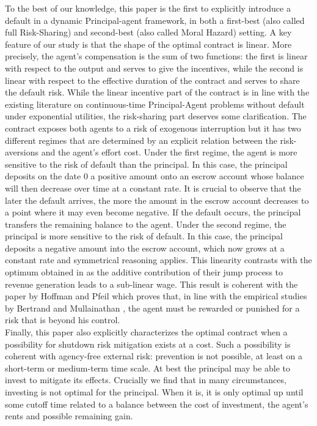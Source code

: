 \documentclass[numbook, envcountsect, envcountsame, envcountreset, runningheads, smallextended]{article}
\begin{document}
\indent To the best of our knowledge, this paper is the first to explicitly introduce a default in a dynamic Principal-agent framework, in both a first-best (also called full Risk-Sharing) and second-best (also called Moral Hazard) setting. 
A key feature of our study is that the shape of the optimal contract is linear.
More precisely, the agent's compensation is the sum of two functions: the first is linear with respect to the output and serves to give the incentives, while the second is linear with respect to the effective duration of the contract and serves to share the default risk. While the linear incentive part of the contract is in line with the existing literature on continuous-time Principal-Agent problems without default under exponential utilities, the risk-sharing part deserves some clarification. 
The contract exposes both agents to a risk of exogenous interruption but it has two different regimes that are determined by an explicit relation between the risk-aversions and the agent's effort cost. Under the first regime, the agent is more sensitive to the risk of default than the principal. In this case, the principal deposits on the date $0$ a positive amount onto an escrow account whose balance will then decrease over time at a constant rate.  It is crucial to observe that the later the default arrives, the more the amount in the escrow account decreases to a point where it may even become negative. If the default occurs, the principal transfers the remaining balance to the agent. Under the second regime, the principal is more sensitive to the risk of default. In this case, the principal deposits a negative amount into the escrow account, which now grows at a constant rate and symmetrical reasoning applies. This linearity contrasts with the optimum obtained in \cite{CF} as the additive contribution of their jump process to revenue generation leads to a sub-linear wage.  This result is coherent with the paper by Hoffman and Pfeil \cite{HoffmanPfeil} which proves that, in line with the empirical studies by Bertrand and Mullainathan \cite{Bertrand}, the agent must be rewarded or punished  for a risk that is beyond his control.\\ 
Finally, this paper also explicitly characterizes the optimal contract when a possibility for shutdown risk mitigation exists at a cost. Such a possibility is coherent with agency-free external risk: prevention is not possible, at least on a short-term or medium-term time scale. At best the principal may be able to invest to mitigate its effects. Crucially we find that in many circumstances, investing is not optimal for the principal. When it is, it is only optimal up until some cutoff time related to a balance between the cost of investment, the agent’s rents  and possible remaining gain. \\
\end{document}
